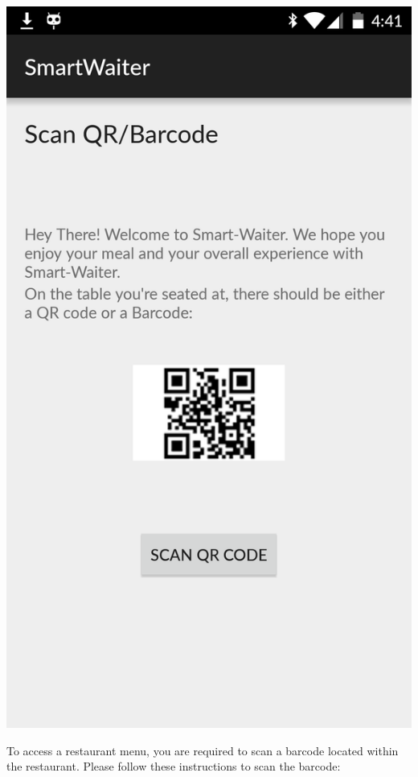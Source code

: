 \documentclass[12pt, titlepage]{article}
\begin{document}
\begin{center}\includegraphics[scale=0.15]{qrcode.png}\end{center}

\noindent To access a restaurant menu, you are required to scan a barcode located within the restaurant. Please follow these instructions to scan the barcode:
\end{document}
